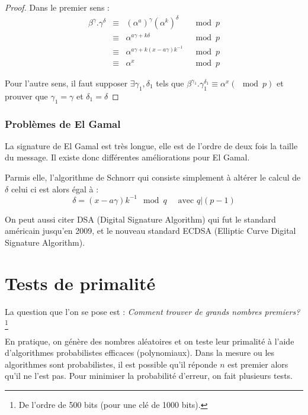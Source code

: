 \documentclass[a4paper, 10pt]{thesis}
\begin{document}
\begin{proof}
    Dans le premier sens : 
    \begin{displaymath}
        \begin{array}{rcll}
            \beta^\gamma . \gamma^\delta & \equiv & (\alpha^a)^\gamma (\alpha^k)^\delta & \mod p \\
                                         & \equiv & \alpha^{a\gamma + k \delta} & \mod p \\
                                         & \equiv & \alpha^{a\gamma + k(x - a\gamma)k^{-1}} & \mod p\\
                                         & \equiv & \alpha^x & \mod p
        \end{array}
    \end{displaymath}

    Pour l'autre sens, il faut supposer $\exists \gamma_1, \delta_1$ tels que $\beta^{\gamma_1}.
    \gamma_1^{\delta_1} \equiv \alpha^x (\mod p)$ et prouver que $\gamma_1 = \gamma$ et $\delta_1 =
    \delta$
\end{proof}

\subsubsection{Problèmes de El Gamal}

La signature de El Gamal est très longue, elle est de l'ordre de deux fois la taille du message. Il
existe donc différentes améliorations pour El Gamal.

Parmis elle, l'algorithme de Schnorr qui consiste simplement à altérer le calcul de $\delta$ celui
ci est alors égal à : \begin{displaymath}
    \delta = (x-a\gamma)k^{-1} \mod q \quad \mbox{ avec } q | (p-1)
\end{displaymath}

On peut aussi citer DSA (Digital Signature Algorithm) qui fut le standard américain jusqu'en 2009,
et le nouveau standard ECDSA (Elliptic Curve Digital Signature Algorithm).

\section{Tests de primalité}

La question que l'on se pose est : \emph{Comment trouver de grands nombres premiers?}\footnote{De
l'ordre de 500 bits (pour une clé de 1000 bits).}

En pratique, on génère des nombres aléatoires et on teste leur primalité à l'aide d'algorithmes
probabilistes efficaces (polynomiaux). Dans la mesure ou les algorithmes sont probabilistes, il est
possible qu'il réponde $n$ est premier alors qu'il ne l'est pas. Pour minimiser la probabilité
d'erreur, on fait plusieurs tests.
\end{document}
